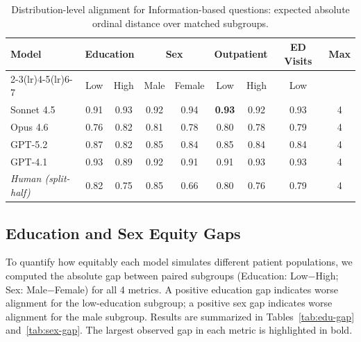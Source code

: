 \begin{table}[htbp]
\centering
\scriptsize
\setlength{\tabcolsep}{3.5pt}
\caption{Distribution-level alignment for Information-based questions: expected absolute ordinal distance over matched subgroups.}
\label{tab:info-expdist-alignment}
\begin{tabular}{lcccccccc}
\toprule
\textbf{Model}
& \multicolumn{2}{c}{\textbf{Education}}
& \multicolumn{2}{c}{\textbf{Sex}}
& \multicolumn{2}{c}{\textbf{Outpatient}}
& \textbf{ED Visits}
& \textbf{Max} \\
\cmidrule(lr){2-3}\cmidrule(lr){4-5}\cmidrule(lr){6-7}
& Low & High & Male & Female & Low & High & Low & \\
\midrule
Sonnet 4.5 & 0.91 & 0.93 & 0.92 & 0.94 & \textbf{0.93} & 0.92 & 0.93 & 4 \\
Opus 4.6 & 0.76 & 0.82 & 0.81 & 0.78 & 0.80 & 0.78 & 0.79 & 4 \\
GPT-5.2 & 0.87 & 0.82 & 0.85 & 0.84 & 0.85 & 0.84 & 0.84 & 4 \\
GPT-4.1 & 0.93 & 0.89 & 0.92 & 0.91 & 0.91 & 0.93 & 0.93 & 4 \\
\midrule
\textit{Human (split-half)} & 0.82 & 0.75 & 0.85 & 0.66 & 0.80 & 0.76 & 0.79 & 4 \\
\bottomrule
\end{tabular}
\end{table}

\subsection{Education and Sex Equity Gaps}

To quantify how equitably each model simulates different patient populations, we computed the absolute gap between paired subgroups (Education: Low$-$High;
Sex: Male$-$Female) for all 4 metrics. A positive education gap indicates worse alignment for the low-education subgroup; a positive sex gap indicates
worse alignment for the male subgroup. Results are summarized in Tables~\ref{tab:edu-gap} and~\ref{tab:sex-gap}. The largest observed gap in each
metric is highlighted in bold.


